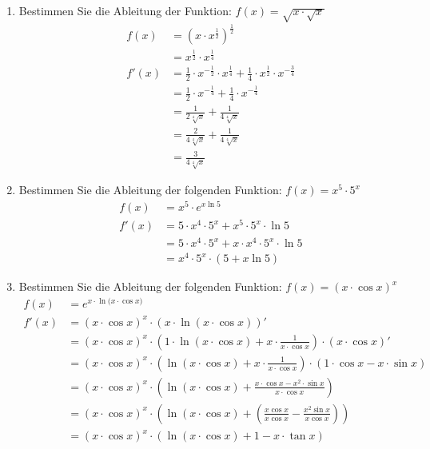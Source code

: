 \documentclass[12pt]{article}
\begin{document}

\noindent
\begin{enumerate}[start=1,label={\bfseries Frage \arabic*:},leftmargin=1in]

    \item Bestimmen Sie die Ableitung der Funktion: $f(x)=\sqrt{x\cdot\sqrt{x}}$
    \begin{align*}
        f(x)&=(x\cdot x^{\frac{1}{2}})^{\frac{1}{2}} \\
        &=x^{\frac{1}{2}} \cdot x^{\frac{1}{4}} \\
        f'(x)&=\frac{1}{2} \cdot x^{-\frac{1}{2}} \cdot x^{\frac{1}{4}} + \frac{1}{4} \cdot x^{\frac{1}{2}} \cdot x^{-\frac{3}{4}} \\
        &=\frac{1}{2} \cdot x^{-\frac{1}{4}} + \frac{1}{4} \cdot x^{-\frac{1}{4}} \\
        &=\frac{1}{2\sqrt[4]{x}} + \frac{1}{4\sqrt[4]{x}} \\
        &=\frac{2}{4\sqrt[4]{x}} + \frac{1}{4\sqrt[4]{x}} \\
        &=\frac{3}{4\sqrt[4]{x}}
    \end{align*}

    \item Bestimmen Sie die Ableitung der folgenden Funktion: $f(x)=x^{5} \cdot 5^{x}$
    \begin{align*}
        f(x)&=x^{5} \cdot e^{x\ln{5}} \\
        f'(x)&=5 \cdot x^{4} \cdot 5^{x} + x^{5} \cdot 5^{x} \cdot \ln{5} \\
        &=5 \cdot x^{4} \cdot 5^{x} + x \cdot x^{4} \cdot 5^{x} \cdot \ln{5} \\
        &=x^{4} \cdot 5^{x} \cdot (5+x\ln{5})
    \end{align*}

    \item Bestimmen Sie die Ableitung der folgenden Funktion: $f(x)=(x \cdot \cos{x})^{x}$
    \begin{align*}
        f(x)&=e^{x \cdot \ln{(x \cdot \cos{x}})} \\
        f'(x)&=(x \cdot \cos{x})^{x} \cdot (x \cdot \ln{(x \cdot \cos{x})})' \\
        &=(x \cdot \cos{x})^{x} \cdot (1 \cdot \ln{(x \cdot \cos{x})} + x \cdot \frac{1}{x \cdot \cos{x}}) \cdot (x \cdot \cos{x})' \\
        &=(x \cdot \cos{x})^{x} \cdot (\ln{(x \cdot \cos{x})} + x \cdot \frac{1}{x \cdot \cos{x}}) \cdot (1 \cdot \cos{x} - x \cdot \sin{x}) \\
        &=(x \cdot \cos{x})^{x} \cdot (\ln{(x \cdot \cos{x})} + \frac{x \cdot \cos{x} - x^{2} \cdot \sin{x}}{x \cdot \cos{x}}) \\
        &=(x \cdot \cos{x})^{x} \cdot (\ln{(x \cdot \cos{x})} + (\frac{x \cos{x}}{x \cos{x}} - \frac{x^{2} \sin{x}}{x \cos{x}})) \\
        &=(x \cdot \cos{x})^{x} \cdot (\ln{(x \cdot \cos{x})} + 1 - x  \cdot \tan{x})
    \end{align*}


\end{enumerate}
\end{document}
